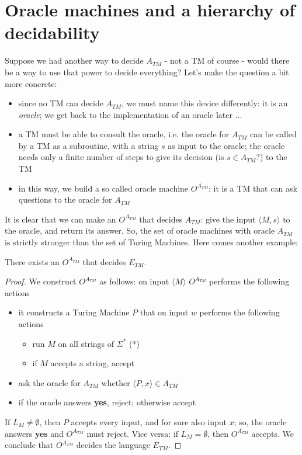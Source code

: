 
\section{Oracle machines and a hierarchy of decidability}

Suppose we had another way to decide $A_{TM}$ - not a TM of course -
would there be a way to use that power to decide everything? Let's
make the question a bit more concrete:
\begin{itemize}
\item since no TM can decide $A_{TM}$, we must name this device
  differently: it is an {\em oracle}; we get back to the
  implementation of an oracle later ...

\item a TM must be able to consult the oracle, i.e. the oracle for
  $A_{TM}$ can be called by a TM as a subroutine, with a string $s$ as
  input to the oracle; the oracle needs only a finite number of steps
  to give its decision (is $s \in A_{TM}$?) to the TM

\item in this way, we build a so called oracle machine $O^{A_{TM}}$:
  it is a TM that can ask questions to the oracle for $A_{TM}$
\end{itemize}

It is clear that we can make an $O^{A_{TM}}$ that decides $A_{TM}$:
give the input $\langle M,s \rangle$ to the oracle, and return its
answer. So, the set of oracle machines with oracle $A_{TM}$ is
strictly stronger than the set of Turing Machines. Here comes another
example:

\begin{theorem}
There exists an $O^{A_{TM}}$ that decides $E_{TM}$.
\end{theorem}
\begin{proof}
We construct $O^{A_{TM}}$ as follows: on input $\langle M \rangle$
$O^{A_{TM}}$ performs the following actions
\begin{itemize}
\item
it constructs a Turing Machine $P$ that on input $w$ performs the
following actions
\begin{itemize}
\item run $M$ on all strings of $\Sigma^*$ (*)\label{allestrings}
\item if $M$ accepts a string, accept
\end{itemize}

\item ask the oracle for $A_{TM}$ whether $\langle P,x \rangle \in
  A_{TM}$

\item if the oracle answers {\bf yes}, reject; otherwise accept
\end{itemize}
If $L_M \neq \emptyset$, then $P$ accepts every input, and for sure
also input $x$; so, the oracle answers {\bf yes} and $O^{A_{TM}}$ must
reject. Vice versa: if $L_M = \emptyset$, then $O^{A_{TM}}$
accepts. We conclude that $O^{A_{TM}}$ decides the language $E_{TM}$.
\end{proof}

